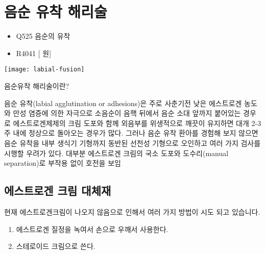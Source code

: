 \section{음순 유착 해리술}
\begin{paracol}{2}
\setlength{\columnseprule}{0.4pt}
\setlength{\columnsep}{2em}
\begin{leftcolumn}
\begin{commentbox}{}
\begin{itemize}\tightlist
\item[\dsjuridical] Q525 음순의 유착 
\item[\dsmedical] R4041 [ 원] 
\end{itemize}
\end{commentbox}
\medskip
\centering

\texttt{[image: labial-fusion]}
\end{leftcolumn}

\begin{rightcolumn}
음순유착 해리술이란? \par
음순 유착(labial agglutination or adhesions)은 주로 사춘기전 낮은 에스트로겐 농도와 만성 염증에 의한 자극으로 소음순이 음핵 뒤에서 음순 소대 앞까지 붙어있는 경우로 에스트로겐제제의 크림 도포와 함께 외음부를 위생적으로 깨끗이 유지하면 대개 2-3주 내에 정상으로 돌아오는 경우가 많다. 그러나 음순 유착 환아를 경험해 보지 않으면 음순 유착을 내부 생식기 기형까지 동반된 선천성 기형으로 오인하고 여러 가지 검사를 시행할 우려가 있다. 대부분 에스트로겐 크림의 국소 도포와 도수리(manual separation)로 부작용 없이 호전을 보임
\end{rightcolumn}
\end{paracol}
\subsection{에스트로겐 크림 대체재}
현재 에스트로겐크림이 나오지 않음으로 인해서 여러 가지 방법이 시도 되고 있습니다.
\begin{enumerate}[①]\tightlist
\item 에스트로겐 질정을 녹여서 손으로 우깨서 사용한다.
\item 스테로이드 크림으로 쓴다.
\end{enumerate}